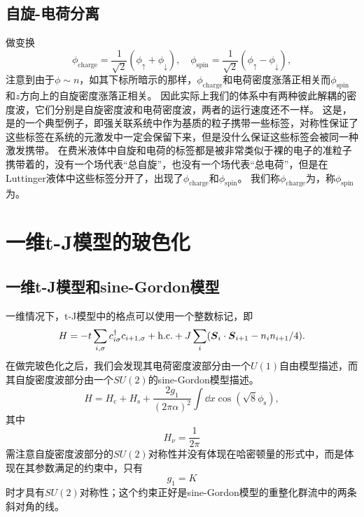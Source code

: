 \subsection{自旋-电荷分离}

做变换
\begin{equation}
    \phi_{\text{charge}} = \frac{1}{\sqrt{2}} (\phi_\uparrow + \phi_\downarrow), \quad \phi_{\text{spin}} = \frac{1}{\sqrt{2}} (\phi_\uparrow - \phi_\downarrow),
\end{equation}
注意到由于$\phi \sim n$，如其下标所暗示的那样，$\phi_\text{charge}$和电荷密度涨落正相关而$\phi_\text{spin}$和$z$方向上的自旋密度涨落正相关。
因此实际上我们的体系中有两种彼此解耦的密度波，它们分别是自旋密度波和电荷密度波，两者的运行速度还不一样。
这是，是的一个典型例子，即强关联系统中作为基质的粒子携带一些标签，对称性保证了这些标签在系统的元激发中一定会保留下来，但是没什么保证这些标签会被同一种激发携带。
在费米液体中自旋和电荷的标签都是被非常类似于裸的电子的准粒子携带着的，没有一个场代表“总自旋”，也没有一个场代表“总电荷”，但是在Luttinger液体中这些标签分开了，出现了$\phi_\text{charge}$和$\phi_\text{spin}$。
我们称$\phi_\text{charge}$为，称$\phi_\text{spin}$为。

\section{一维t-J模型的玻色化}

\subsection{一维t-J模型和sine-Gordon模型}

一维情况下，t-J模型中的格点可以使用一个整数标记，即
\begin{equation}
    H = - t \sum_{i, \sigma} c_{i \sigma}^\dagger c_{i+1, \sigma} + \text{h.c.} + J \sum_i (\vb*{S}_i \cdot \vb*{S}_{i+1} - n_i n_{i+1} / 4).
\end{equation}
在做完玻色化之后，我们会发现其电荷密度波部分由一个$U(1)$自由模型描述，而其自旋密度波部分由一个$SU(2)$的sine-Gordon模型描述。
\begin{equation}
    H = H_\text{c} + H_\text{s} + \frac{2g_1}{(2\pi \alpha)^2} \int \dd{x} \cos(\sqrt{8} \phi_\text{s}),
\end{equation}
其中
\begin{equation}
    H_\nu = \frac{1}{2\pi}
\end{equation}
需注意自旋密度波部分的$SU(2)$对称性并没有体现在哈密顿量的形式中，而是体现在其参数满足的约束中，只有
\begin{equation}
    g_1 = K
\end{equation}
时才具有$SU(2)$对称性；这个约束正好是sine-Gordon模型的重整化群流中的两条斜对角的线。

